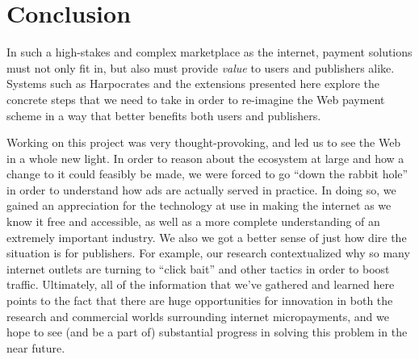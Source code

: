 \section{Conclusion}
In such a high-stakes and complex marketplace as the internet, payment solutions must not only fit in, but also must provide \textit{value} to users and publishers alike.
Systems such as Harpocrates and the extensions presented here explore the concrete steps that we need to take in order to re-imagine the Web payment scheme in a way that better benefits both users and publishers.

Working on this project was very thought-provoking, and led us to see the Web in a whole new light.
In order to reason about the ecosystem at large and how a change to it could feasibly be made, we were forced to go ``down the rabbit hole'' in order to understand how ads are actually served in practice.
In doing so, we gained an appreciation for the technology at use in making the internet as we know it free and accessible, as well as a more complete understanding of an extremely important industry.
We also we got a better sense of just how dire the situation is for publishers.
For example, our research contextualized why so many internet outlets are turning to ``click bait'' and other tactics in order to boost traffic.
Ultimately, all of the information that we've gathered and learned here points to the fact that there are huge opportunities for innovation in both the research and commercial worlds surrounding internet micropayments, and we hope to see (and be a part of) substantial progress in solving this problem in the near future.
